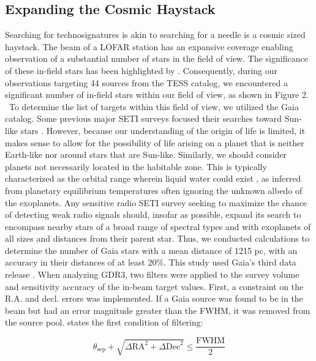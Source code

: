 \subsection{Expanding the Cosmic Haystack}

Searching for technosignatures is akin to searching for a needle is a cosmic sized haystack. The beam of a LOFAR station has an expansive coverage enabling observation of a substantial number of stars in the field of view. The significance of these in-field stars has been highlighted by \cite{Bart-Wlodarczyk-Sroka}. Consequently, during our observations targeting 44 sources from the TESS catalog, we encountered a significant number of in-field stars within our field of view, as shown in Figure 2. \ 
To determine the list of targets within this field of view, we utilized the Gaia catalog. Some previous major SETI surveys focused their searches toward Sun-like stars \citep{Tarter:1996jf}. However, because our understanding of the origin of life is limited, it makes sense to allow for the possibility of life arising on a planet that is neither Earth-like nor around stars that are Sun-like. Similarly, we should consider planets not necessarily located in the habitable zone. This is typically characterized as the orbital range wherein liquid water could exist \citep{Kasting1993}, as inferred from planetary equilibrium temperatures often ignoring the unknown albedo of the exoplanets. Any sensitive radio SETI survey seeking to maximize the chance of detecting weak radio signals should, insofar as possible, expand its search to encompass nearby stars of a broad range of spectral types and with exoplanets of all sizes and distances from their parent star. Thus, we conducted calculations to determine the number of Gaia stars with a mean distance of 1215 pc, with an accuracy in their distances of at least 20\%. This study used Gaia's third data release \cite[GDR3;][]{GaiaDR3,astroquery}. When analyzing GDR3, two filters were applied to the survey volume and sensitivity accuracy of the in-beam target values. First, a constraint on the R.A. and decl. errors was implemented. If a Gaia source was found to be in the beam but had an error magnitude greater than the FWHM, it was removed from the source pool.  states the first condition of filtering:

\begin{equation}
    \theta_{\text{sep}} + \sqrt{\Delta \text{RA}^2 + \Delta \text{Dec}^2} \leq \frac{\text{FWHM}}{2}
    \label{Gaia:filter1}
\end{equation}

